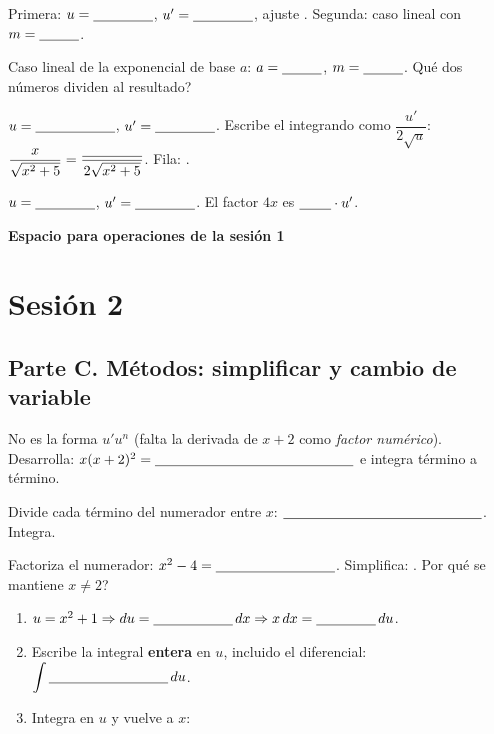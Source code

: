 \documentclass[11pt]{article}
\begin{document}
Primera: \(u=\hueco[1.5cm]\), \(u'=\hueco[1.5cm]\), ajuste \hueco[1.5cm]. Segunda: caso lineal con \(m=\hueco[1cm]\).
\resultado

Caso lineal de la exponencial de base \(a\): \(a=\hueco[1cm]\), \(m=\hueco[1cm]\). \textquestiondown{}Qué dos números dividen al resultado? \hueco[4cm]
\resultado\comprueba

\(u=\hueco[2cm]\), \(u'=\hueco[1.5cm]\). Escribe el integrando como \(\dfrac{u'}{2\sqrt u}\): \(\dfrac{x}{\sqrt{x^2+5}}=\dfrac{\hueco[1.5cm]}{2\sqrt{x^2+5}}\). Fila: \hueco[3cm].
\resultado\comprueba

\(u=\hueco[1.5cm]\), \(u'=\hueco[1.5cm]\). El factor \(4x\) es \(\hueco[0.8cm]\cdot u'\).
\resultado\comprueba


\bigskip
\noindent\textbf{Espacio para operaciones de la sesión 1}
\vfill

\clearpage
\section*{Sesión 2}
\subsection*{Parte C. Métodos: simplificar y cambio de variable}
\setcounter{ejercicio}{0}

No es la forma \(u'u^n\) (falta la derivada de \(x+2\) como \emph{factor numérico}). Desarrolla: \(x(x+2)^2=\hueco[5cm]\) e integra término a término.
\resultado\comprueba

Divide cada término del numerador entre \(x\): \(\hueco[5cm]\). Integra.
\resultado

Factoriza el numerador: \(x^2-4=\hueco[3cm]\). Simplifica: \hueco[2cm]. \textquestiondown{}Por qué se mantiene \(x\ne2\)? \hueco[5cm]
\resultado

\begin{enumerate}[label=\alph*)]
  \item \(u=x^2+1\Rightarrow du=\hueco[2cm]\,dx\Rightarrow x\,dx=\hueco[1.5cm]\,du\).
  \item Escribe la integral \textbf{entera} en \(u\), incluido el diferencial: \(\displaystyle\int\hueco[3cm]\,du\).
  \item Integra en \(u\) y vuelve a \(x\): \hueco[6cm]
\end{enumerate}
\resultado\comprueba
\end{document}
